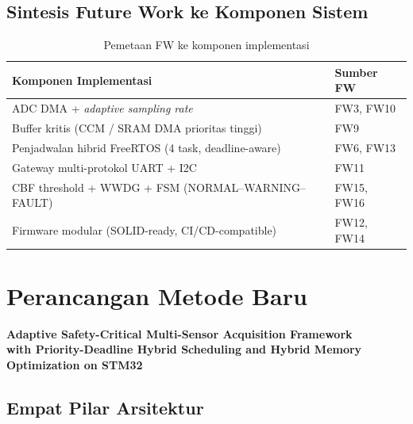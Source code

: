 \documentclass[12pt,a4paper]{article}
\begin{document}
\subsection{Sintesis Future Work ke Komponen Sistem}

\begin{table}[H]
\centering
\caption{Pemetaan FW ke komponen implementasi}\label{tab:fwmap}
\begin{tabular}{@{}ll@{}}
\toprule
\textbf{Komponen Implementasi} & \textbf{Sumber FW} \\
\midrule
ADC DMA + \textit{adaptive sampling rate} & FW3, FW10 \\
Buffer kritis (CCM / SRAM DMA prioritas tinggi) & FW9 \\
Penjadwalan hibrid FreeRTOS (4 task, deadline-aware) & FW6, FW13 \\
Gateway multi-protokol UART + I2C & FW11 \\
CBF threshold + WWDG + FSM (NORMAL--WARNING--FAULT) & FW15, FW16 \\
Firmware modular (SOLID-ready, CI/CD-compatible) & FW12, FW14 \\
\bottomrule
\end{tabular}
\end{table}

\section{Perancangan Metode Baru}

\begin{tcolorbox}[colback=itsgold!10, colframe=itsgold!80!black, boxrule=0.8pt, arc=4pt]
\centering\bfseries
Adaptive Safety-Critical Multi-Sensor Acquisition Framework\\
with Priority-Deadline Hybrid Scheduling and Hybrid Memory Optimization on STM32
\end{tcolorbox}

\subsection{Empat Pilar Arsitektur}
\end{document}
